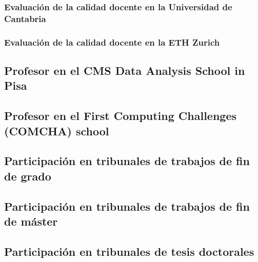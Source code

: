 \documentclass[a4paper, 11pt, twoside, openright]{report}
\begin{document}
\subsubsection{Evaluación de la calidad docente en la Universidad de Cantabria}


\subsubsection{Evaluación de la calidad docente en la ETH Zurich}


\subsection{Profesor en el CMS Data Analysis School in Pisa}


\subsection{Profesor en el First Computing Challenges (COMCHA) school}


\subsection{Participación en tribunales de trabajos de fin de grado}


\subsection{Participación en tribunales de trabajos de fin de máster}


\subsection{Participación en tribunales de tesis doctorales}

\end{document}
